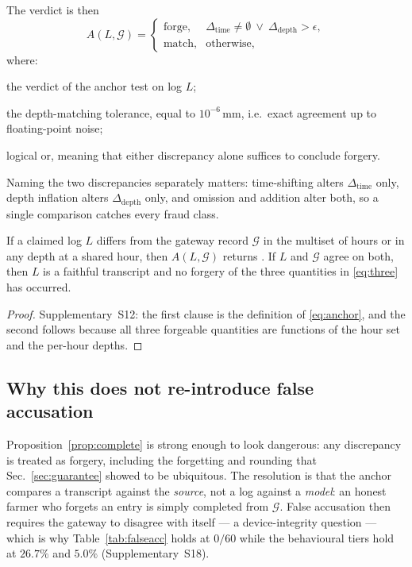 The verdict is then
\begin{equation}
A(L,\mathcal{G})=
\begin{cases}
\text{forge}, & \Delta_{\mathrm{time}}\neq\emptyset
\ \vee\ \Delta_{\mathrm{depth}}>\epsilon,\\
\text{match}, & \text{otherwise},
\end{cases}
\label{eq:anchor}
\end{equation}
where:
\begin{symbolist}
\item[$A(L,\mathcal{G})$] the verdict of the anchor test on log $L$;
\item[$\epsilon$] the depth-matching tolerance, equal to $10^{-6}$\,mm, i.e.\ exact agreement up to floating-point noise;
\item[$\vee$] logical or, meaning that either discrepancy alone suffices to conclude forgery.
\end{symbolist}
Naming the two discrepancies separately matters: time-shifting alters
$\Delta_{\mathrm{time}}$ only, depth inflation alters
$\Delta_{\mathrm{depth}}$ only, and omission and addition alter both, so a
single comparison catches every fraud class.

\begin{proposition}
\label{prop:complete}
If a claimed log $L$ differs from the gateway record $\mathcal{G}$ in the
multiset of hours or in any depth at a shared hour, then $A(L,\mathcal{G})$
returns . If $L$ and $\mathcal{G}$ agree on both, then $L$ is a
faithful transcript and no forgery of the three quantities in \eqref{eq:three}
has occurred.
\end{proposition}

\begin{proof}
Supplementary~S12: the first clause is the definition of \eqref{eq:anchor},
and the second follows because all three forgeable quantities are functions of
the hour set and the per-hour depths.
\end{proof}

\subsection{Why this does not re-introduce false accusation}

Proposition~\ref{prop:complete} is strong enough to look dangerous: any
discrepancy is treated as forgery, including the forgetting and rounding that
Sec.~\ref{sec:guarantee} showed to be ubiquitous. The resolution is that the
anchor compares a transcript against the \emph{source}, not a log against a
\emph{model}: an honest farmer who forgets an entry is simply completed from
$\mathcal{G}$. False accusation then requires the gateway to disagree with
itself --- a device-integrity question --- which is why Table~\ref{tab:falseacc}
holds at $0/60$ while the behavioural tiers hold at $26.7\%$ and $5.0\%$
(Supplementary~S18).

